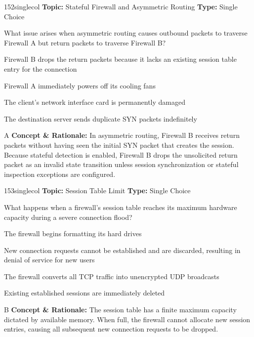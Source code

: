 \begin{qcard}{152}{singlecol}
\textcolor{darkslate!75}{\small\textbf{Topic:} Stateful Firewall and Asymmetric Routing \hfill \textbf{Type:} Single Choice}\vspace{0.4em}\par
What issue arises when asymmetric routing causes outbound packets to traverse Firewall A but return packets to traverse Firewall B?
\begin{qoptions}
\item Firewall B drops the return packets because it lacks an existing session table entry for the connection
\item Firewall A immediately powers off its cooling fans
\item The client's network interface card is permanently damaged
\item The destination server sends duplicate SYN packets indefinitely
\end{qoptions}
\end{qcard}
\nopagebreak
\begin{explainbox}{A}
\textbf{Concept \& Rationale:} In asymmetric routing, Firewall B receives return packets without having seen the initial SYN packet that creates the session. Because stateful detection is enabled, Firewall B drops the unsolicited return packet as an invalid state transition unless session synchronization or stateful inspection exceptions are configured.
\end{explainbox}

\begin{qcard}{153}{singlecol}
\textcolor{darkslate!75}{\small\textbf{Topic:} Session Table Limit \hfill \textbf{Type:} Single Choice}\vspace{0.4em}\par
What happens when a firewall's session table reaches its maximum hardware capacity during a severe connection flood?
\begin{qoptions}
\item The firewall begins formatting its hard drives
\item New connection requests cannot be established and are discarded, resulting in denial of service for new users
\item The firewall converts all TCP traffic into unencrypted UDP broadcasts
\item Existing established sessions are immediately deleted
\end{qoptions}
\end{qcard}
\nopagebreak
\begin{explainbox}{B}
\textbf{Concept \& Rationale:} The session table has a finite maximum capacity dictated by available memory. When full, the firewall cannot allocate new session entries, causing all subsequent new connection requests to be dropped.
\end{explainbox}


